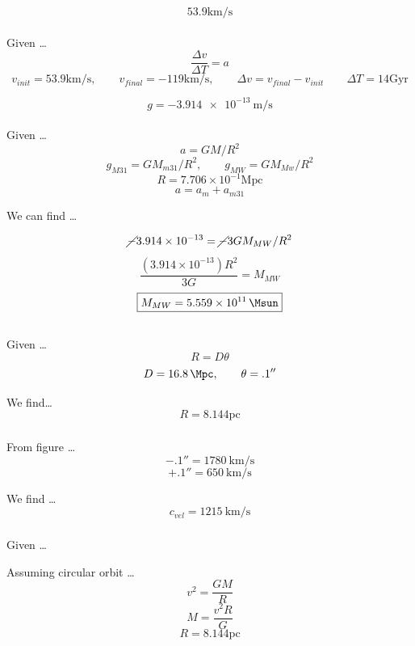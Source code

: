 \documentclass{article}
\begin{document}
\[\boxed{53.9 \si{\km /\s}}\]

\paragraph{}
Given \dots
\[\frac{\Delta v}{\Delta T} = a \]
\[v_{init} = 53.9 \si{\km /\s}, \qquad v_{final} = -119 \text{km/s}, \qquad \Delta v = v_{final} - v_{init}  \qquad \Delta T = 14 \text{Gyr}\]

\[\boxed{g = \SI{-3.914e-13}{\m/\s}}\]


\paragraph{}

Given \dots
\[a = GM/R^2\]
\[g_{M31} = GM_{m31}/R^2, \qquad g_{MW} = GM_{Mw}/R^2\]
\[R = 7.706 \times 10^{-1}\text{Mpc}\]
\[a = a_m + a_{m31}\]

We can find \dots

\[\cancel{-}3.914 \times 10^{-13}  = \cancel{-}3 GM_{MW}/R^2\]
\[\frac{(3.914 \times 10^{-13}) R^2 }{3G}  = M_{MW}\]
\[\boxed{M_{MW} = \SI{ 5.559e+11}{\Msun}}\]


\subsection{}
\subsubsection{}

Given \dots
\[R = D\theta\]
\[D = \SI{16.8}{\Mpc}, \qquad \theta = .1''\]

We find\dots
\[\boxed{R = 8.144\text{pc}}\]

\subsubsection{}

From figure \dots
\[-.1'' = \SI{1780}{\km/\s}\]
\[+.1'' = \SI{650}{\km/\s}\]

We find \dots
\[\boxed{c_{vel} = \SI{1215}{\km/\s}}\]

\subsubsection{}

Given \dots

Assuming circular orbit \dots
\[v^2 = \frac{GM}{R}\]
\[M = \frac{v^2 R }{G}\]
\[R = 8.144 \text{pc}\]
\end{document}
